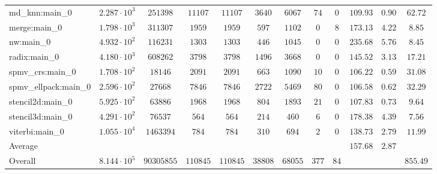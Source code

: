 \begin{tabular}{|l|c|c|c|c|c|c|c|c|c|c|c|}
md\_knn:main\_0        & $ 2.287 \cdot 10^{3} $ & $ 251398   $ & $ 11107  $ & $ 11107  $ & $ 3640  $ & $ 6067  $ & $ 74  $ & $ 0  $ & $ 109.93      $ & $ 0.90    $ & $ 62.72   $ \\
merge:main\_0          & $ 1.798 \cdot 10^{3} $ & $ 311307   $ & $ 1959   $ & $ 1959   $ & $ 597   $ & $ 1102  $ & $ 0   $ & $ 8  $ & $ 173.13      $ & $ 4.22    $ & $ 8.85    $ \\
nw:main\_0             & $ 4.932 \cdot 10^{2} $ & $ 116231   $ & $ 1303   $ & $ 1303   $ & $ 446   $ & $ 1045  $ & $ 0   $ & $ 0  $ & $ 235.68      $ & $ 5.76    $ & $ 8.45    $ \\
radix:main\_0          & $ 4.180 \cdot 10^{3} $ & $ 608262   $ & $ 3798   $ & $ 3798   $ & $ 1496  $ & $ 3668  $ & $ 0   $ & $ 0  $ & $ 145.52      $ & $ 3.13    $ & $ 17.21   $ \\
spmv\_crs:main\_0      & $ 1.708 \cdot 10^{2} $ & $ 18146    $ & $ 2091   $ & $ 2091   $ & $ 663   $ & $ 1090  $ & $ 10  $ & $ 0  $ & $ 106.22      $ & $ 0.59    $ & $ 31.08   $ \\
spmv\_ellpack:main\_0  & $ 2.596 \cdot 10^{2} $ & $ 27668    $ & $ 7846   $ & $ 7846   $ & $ 2722  $ & $ 5469  $ & $ 80  $ & $ 0  $ & $ 106.58      $ & $ 0.62    $ & $ 32.29   $ \\
stencil2d:main\_0      & $ 5.925 \cdot 10^{2} $ & $ 63886    $ & $ 1968   $ & $ 1968   $ & $ 804   $ & $ 1893  $ & $ 21  $ & $ 0  $ & $ 107.83      $ & $ 0.73    $ & $ 9.64    $ \\
stencil3d:main\_0      & $ 4.291 \cdot 10^{2} $ & $ 76537    $ & $ 564    $ & $ 564    $ & $ 214   $ & $ 460   $ & $ 6   $ & $ 0  $ & $ 178.38      $ & $ 4.39    $ & $ 7.56    $ \\
viterbi:main\_0        & $ 1.055 \cdot 10^{4} $ & $ 1463394  $ & $ 784    $ & $ 784    $ & $ 310   $ & $ 694   $ & $ 2   $ & $ 0  $ & $ 138.73      $ & $ 2.79    $ & $ 11.99   $ \\
\hline
Average                & $                    $ & $          $ & $        $ & $        $ & $       $ & $       $ & $     $ & $    $ & $ 157.68      $ & $ 2.87    $ & $         $ \\
\hline
Overall                & $ 8.144 \cdot 10^{5} $ & $ 90305855 $ & $ 110845 $ & $ 110845 $ & $ 38808 $ & $ 68055 $ & $ 377 $ & $ 84 $ & $             $ & $         $ & $ 855.49  $ \\
\hline
\end{tabular}
